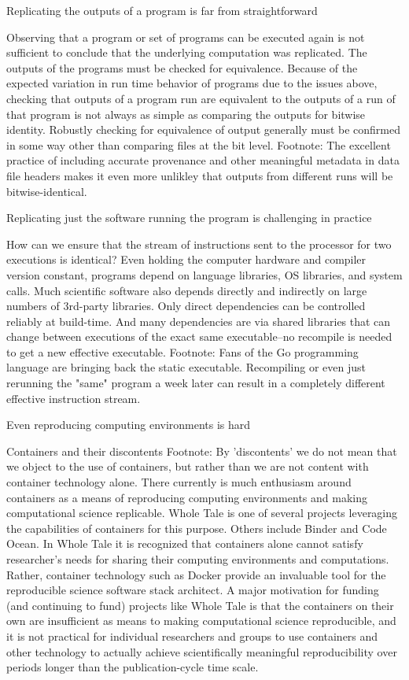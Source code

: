 		Replicating the outputs of a program is far from straightforward

			Observing that a program or set of programs can be executed again is not sufficient to conclude that the underlying computation
				was replicated.  The outputs of the programs must be checked for equivalence.
			Because of the expected variation in run time behavior of programs due to the issues above, checking that outputs of a program
				run are equivalent to the outputs of a run of that program is not always as simple as 
				comparing the outputs for bitwise identity.
			Robustly checking for equivalence of output generally must be confirmed in some way other than comparing files at the bit level.
			Footnote: The excellent practice of including accurate provenance and other meaningful metadata in data file headers makes it 
				even more unlikley that outputs from different runs will be bitwise-identical.
	
		Replicating just the software running the program is challenging in practice
	
			How can we ensure that the stream of instructions sent to the processor for two executions is identical?
			Even holding the computer hardware and compiler version constant, programs depend on language libraries, OS libraries, and system calls.
			Much scientific software also depends directly and indirectly on large numbers of 3rd-party libraries.
			Only direct dependencies can be controlled reliably at build-time.  And many dependencies are via shared libraries that can change between executions
				of the exact same executable--no recompile is needed to get a new effective executable.
			Footnote:  Fans of the Go programming language are bringing back the static executable.
			Recompiling or even just rerunning the "same" program a week later can result in a completely different effective instruction stream.
			
		Even reproducing computing environments is hard
	
			Containers and their discontents
				Footnote:  By 'discontents' we do not mean that we object to the use of containers, but rather than we are not content with container technology alone.
				There currently is much enthusiasm around containers as a means of reproducing computing environments and making computational science replicable.
				Whole Tale is one of several projects leveraging the capabilities of containers for this purpose.  Others include Binder and Code Ocean.
				In Whole Tale it is recognized that containers alone cannot satisfy researcher's needs for sharing their computing environments and computations.
				Rather, container technology such as Docker provide an invaluable tool for the reproducible science software stack architect.
				A major motivation for funding (and continuing to fund) projects like Whole Tale is that the containers on their own are insufficient as means
					to making computational science reproducible, and it is not practical for individual researchers and groups to use containers 
					and other technology to actually achieve scientifically meaningful reproducibility over periods longer than the publication-cycle time scale.
	

